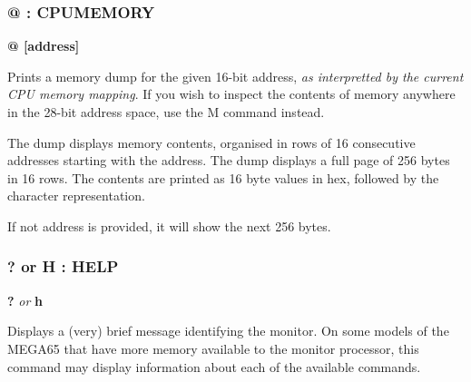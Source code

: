 \subsubsection{@ : CPUMEMORY}
\begin{description}[leftmargin=2cm,style=nextline]
\item [Format:] {\bf @ [address]}
\item [Usage:] Prints a memory dump for the given 16-bit address,
  {\em as interpretted by the current CPU memory mapping}.
  If you wish to inspect the contents of memory anywhere in the 28-bit
  address space, use the M command instead.

  The dump displays memory contents, organised in rows
  of 16 consecutive addresses starting with the
  address. The dump displays
  a full page of 256 bytes in 16 rows.
  The contents are printed as 16 byte values in hex,
  followed by the character representation.

\item [Remarks:] If not address is provided, it will show the next 256 bytes.

\end{description}

\subsubsection{? or H : HELP}
\begin{description}[leftmargin=2cm,style=nextline]
\item [Format:] {\bf ?} {\em or} {\bf h}
\item [Usage:] Displays a (very) brief message identifying the monitor.
  On some models of the MEGA65 that have more memory available to the
  monitor processor, this command may display information about each
  of the available commands.

\end{description}


